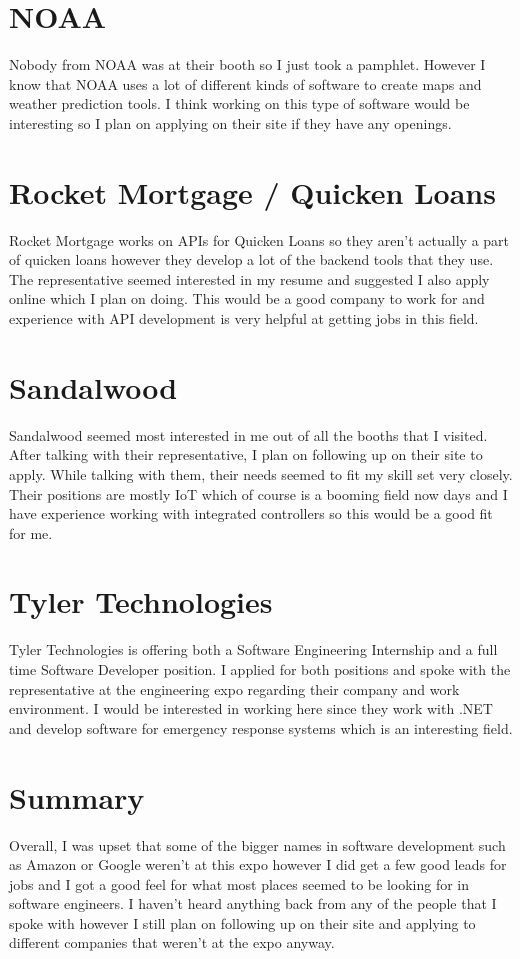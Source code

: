 \documentclass{report}
\begin{document}
\section*{NOAA}
Nobody from NOAA was at their booth so I just took a pamphlet. However I know that NOAA uses a lot of different kinds of software to create maps and weather prediction tools. I think working on this type of software would be interesting so I plan on applying on their site if they have any openings.

\section*{Rocket Mortgage / Quicken Loans}
Rocket Mortgage works on APIs for Quicken Loans so they aren't actually a part of quicken loans however they develop a lot of the backend tools that they use. The representative seemed interested in my resume and suggested I also apply online which I plan on doing. This would be a good company to work for and experience with API development is very helpful at getting jobs in this field.

\section*{Sandalwood}
Sandalwood seemed most interested in me out of all the booths that I visited. After talking with their representative, I plan on following up on their site to apply. While talking with them, their needs seemed to fit my skill set very closely. Their positions are mostly IoT which of course is a booming field now days and I have experience working with integrated controllers so this would be a good fit for me.

\section*{Tyler Technologies}
Tyler Technologies is offering both a Software Engineering Internship and a full time Software Developer position. I applied for both positions and spoke with the representative at the engineering expo regarding their company and work environment. I would be interested in working here since they work with .NET and develop software for emergency response systems which is an interesting field.

\section*{Summary}
Overall, I was upset that some of the bigger names in software development such as Amazon or Google weren't at this expo however I did get a few good leads for jobs and I got a good feel for what most places seemed to be looking for in software engineers. I haven't heard anything back from any of the people that I spoke with however I still plan on following up on their site and applying to different companies that weren't at the expo anyway.
\end{document}
